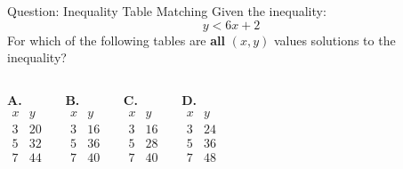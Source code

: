 \documentclass{beamer}
\begin{document}
\begin{frame}{Question: Inequality Table Matching}
    \small
    Given the inequality:
    \[
    y < 6x + 2
    \]
    For which of the following tables are \textbf{all} $(x, y)$ values solutions to the inequality?

\vspace{5mm}

    \begin{columns}
    \textbf{A.}
    \[
    \begin{array}{c|c}
    x & y \\
    \hline
    3 & 20 \\
    5 & 32 \\
    7 & 44 \\
    \end{array}
    \]

    \textbf{B.}
    \[
    \begin{array}{c|c}
    x & y \\
    \hline
    3 & 16 \\
    5 & 36 \\
    7 & 40 \\
    \end{array}
    \]

    \textbf{C.}
    \[
    \begin{array}{c|c}
    x & y \\
    \hline
    3 & 16 \\
    5 & 28 \\
    7 & 40 \\
    \end{array}
    \]

    \textbf{D.}
    \[
    \begin{array}{c|c}
    x & y \\
    \hline
    3 & 24 \\
    5 & 36 \\
    7 & 48 \\
    \end{array}
    \]
    \end{columns}
\end{frame}
\end{document}
